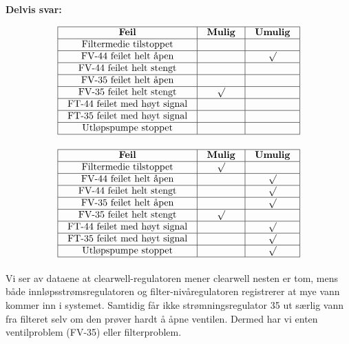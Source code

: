 
\noindent
{\bf Delvis svar:}



$$\vbox{\offinterlineskip
\halign{\strut
\vrule \quad\hfil # \ \hfil & 
\vrule \quad\hfil # \ \hfil & 
\vrule \quad\hfil # \ \hfil \vrule \cr
\noalign{\hrule}
%
{\bf Feil} & {\bf Mulig} & {\bf Umulig} \cr
%
\noalign{\hrule}
%
Filtermedie tilstoppet &  &  \cr
%
\noalign{\hrule}
%
FV-44 feilet helt åpen &  & $\surd$ \cr
%
\noalign{\hrule}
%
FV-44 feilet helt stengt &  &  \cr
%
\noalign{\hrule}
%
FV-35 feilet helt åpen &  &  \cr
%
\noalign{\hrule}
%
FV-35 feilet helt stengt & $\surd$ &  \cr
%
\noalign{\hrule}
%
FT-44 feilet med høyt signal &  &  \cr
%
\noalign{\hrule}
%
FT-35 feilet med høyt signal &  &  \cr
%
\noalign{\hrule}
%
Utløpspumpe stoppet &  &  \cr
%
\noalign{\hrule}
} %
}$$ %








$$\vbox{\offinterlineskip
\halign{\strut
\vrule \quad\hfil # \ \hfil & 
\vrule \quad\hfil # \ \hfil & 
\vrule \quad\hfil # \ \hfil \vrule \cr
\noalign{\hrule}
%
{\bf Feil} & {\bf Mulig} & {\bf Umulig} \cr
%
\noalign{\hrule}
%
Filtermedie tilstoppet & $\surd$ &  \cr
%
\noalign{\hrule}
%
FV-44 feilet helt åpen &  & $\surd$ \cr
%
\noalign{\hrule}
%
FV-44 feilet helt stengt &  & $\surd$ \cr
%
\noalign{\hrule}
%
FV-35 feilet helt åpen &  & $\surd$ \cr
%
\noalign{\hrule}
%
FV-35 feilet helt stengt & $\surd$ &  \cr
%
\noalign{\hrule}
%
FT-44 feilet med høyt signal &  & $\surd$ \cr
%
\noalign{\hrule}
%
FT-35 feilet med høyt signal &  & $\surd$ \cr
%
\noalign{\hrule}
%
Utløpspumpe stoppet &  & $\surd$ \cr
%
\noalign{\hrule}
} %
}$$ %


Vi ser av dataene at clearwell-regulatoren mener clearwell nesten er tom, mens både innløpsstrømsregulatoren og filter-nivåregulatoren registrerer at mye vann kommer inn i systemet. Samtidig får ikke strømningsregulator 35 ut særlig vann fra filteret selv om den prøver hardt å åpne ventilen. Dermed har vi enten ventilproblem (FV-35) eller filterproblem.



